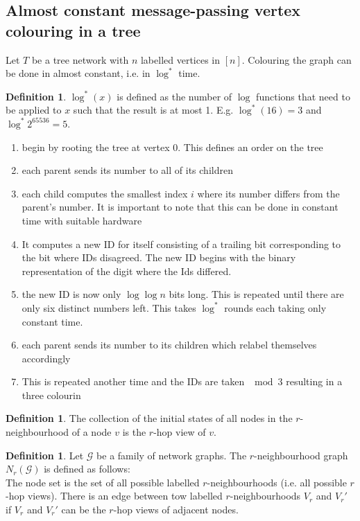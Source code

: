 \documentclass[a4paper, 12pt]{article}
\theoremstyle{plain}
\theoremstyle{definition}
\newtheorem{definition}[theorem]{Definition} %
\theoremstyle{lemma}
\theoremstyle{remark}
\theoremstyle{corollary}
\theoremstyle{example}
\begin{document}
	\subsection{Almost constant message-passing vertex colouring in a tree}
	Let $T$ be a tree network with $n$ labelled vertices in $[n]$. Colouring the graph can be done in almost constant, i.e. in $\log^*$ time.
	\begin{definition}
		$\log^*(x)$ is defined as the number of $\log$ functions that need to be applied to $x$ such that the result is at most 1. E.g. $\log^*(16) = 3$ and $\log^*2^{65536} = 5$.
	\end{definition}
	\begin{enumerate}
		\item begin by rooting the tree at vertex $0$. This defines an order on the tree
		\item each parent sends its number to all of its children
		\item each child computes the smallest index $i$ where its number differs from the parent's number. It is important to note that this can be done in constant time with suitable hardware
		\item It computes a new ID for itself consisting of a trailing bit corresponding to the bit where IDs disagreed. The new ID begins with the binary representation of the digit where the Ids differed.
		\item the new ID is now only $\log\log n$ bits long. This is repeated until there are only six distinct numbers left. This takes $\log^*$ rounds each taking only constant time.
		\item each parent sends its number to its children which relabel themselves accordingly
		\item This is repeated another time and the IDs are taken $\mod 3$ resulting in a three colourin
	\end{enumerate}
	\begin{definition}
		The collection of the initial states of all nodes in the $r$-neighbourhood of a node $v$ is the $r$-hop view of $v$.
	\end{definition}
	\begin{definition}
		Let $\mathcal{G}$ be a family of network graphs. The $r$-neighbourhood graph $N_r(\mathcal{G})$ is defined as follows:\\
		The node set is the set of all possible labelled $r$-neighbourhoods (i.e. all possible $r$-hop views). There is an edge between tow labelled $r$-neighbourhoods $V_r$ and $V_r'$ if $V_r$ and $V_r'$ can be the $r$-hop views of adjacent nodes.
	\end{definition}
\end{document}
